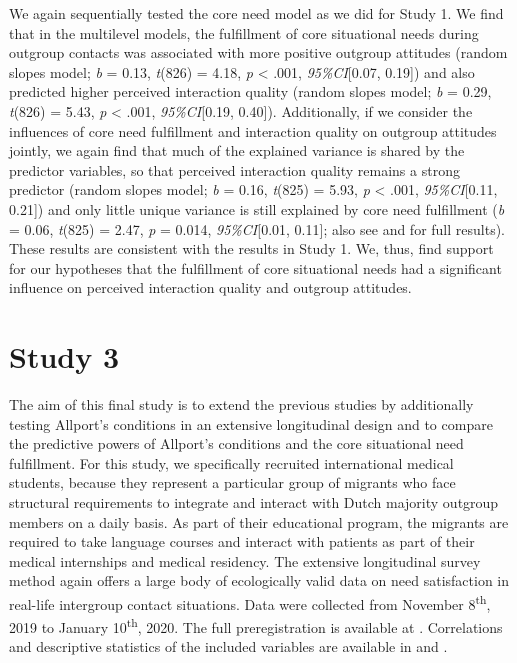 We again sequentially tested the core need model as we did for Study 1.
We find that in the multilevel models, the fulfillment of core
situational needs during outgroup contacts was associated with more
positive outgroup attitudes (random slopes model; \textit{b} = 0.13,
\textit{t}(826) = 4.18, \textit{p} \textless{} .001,
\textit{95\%CI}{[}0.07, 0.19{]}) and also predicted higher perceived
interaction quality (random slopes model; \textit{b} = 0.29,
\textit{t}(826) = 5.43, \textit{p} \textless{} .001,
\textit{95\%CI}{[}0.19, 0.40{]}). Additionally, if we consider the
influences of core need fulfillment and interaction quality on outgroup
attitudes jointly, we again find that much of the explained variance is
shared by the predictor variables, so that perceived interaction quality
remains a strong predictor (random slopes model; \textit{b} = 0.16,
\textit{t}(825) = 5.93, \textit{p} \textless{} .001,
\textit{95\%CI}{[}0.11, 0.21{]}) and only little unique variance is
still explained by core need fulfillment (\textit{b} = 0.06,
\textit{t}(825) = 2.47, \textit{p} = 0.014, \textit{95\%CI}{[}0.01,
0.11{]}; also see  and
 for full results). These results are
consistent with the results in Study 1. We, thus, find support for our
hypotheses that the fulfillment of core situational needs had a
significant influence on perceived interaction quality and outgroup
attitudes.

\section{Study 3}

The aim of this final study is to extend the previous studies by
additionally testing Allport's conditions in an extensive longitudinal
design and to compare the predictive powers of Allport's conditions and
the core situational need fulfillment. For this study, we specifically
recruited international medical students, because they represent a
particular group of migrants who face structural requirements to
integrate and interact with Dutch majority outgroup members on a daily
basis. As part of their educational program, the migrants are required
to take language courses and interact with patients as part of their
medical internships and medical residency. The extensive longitudinal
survey method again offers a large body of ecologically valid data on
need satisfaction in real-life intergroup contact situations. Data were
collected from November 8\textsuperscript{th}, 2019 to January
10\textsuperscript{th}, 2020. The full preregistration is available at
\citet[][]{KreienkampMasked2021f}. Correlations and descriptive
statistics of the included variables are available in
 and .

